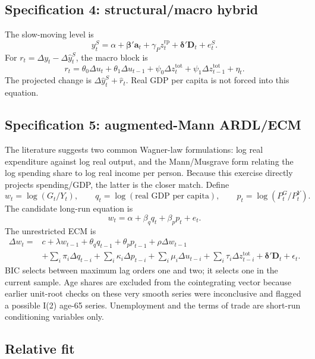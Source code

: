 \documentclass[11pt,a4paper]{article}
\begin{document}
\subsection{Specification 4: structural/macro hybrid}

The slow-moving level is
\begin{equation}
y_t^S=\alpha+\boldsymbol\beta'\mathbf a_t+\gamma_Pz_t^{\mathrm{rp}}
+\boldsymbol\delta'\mathbf D_t+e_t^S.
\end{equation}
For $r_t=\Delta y_t-\Delta\widehat y_t^S$, the macro block is
\begin{equation}
r_t=\theta_0\Delta u_t+\theta_1\Delta u_{t-1}
+\psi_0\Delta z_t^{\mathrm{tot}}+\psi_1\Delta z_{t-1}^{\mathrm{tot}}+\eta_t.
\end{equation}
The projected change is $\Delta\widehat y_t^S+\widehat r_t$. Real GDP per capita is not forced into this equation.

\subsection{Specification 5: augmented-Mann ARDL/ECM}

The literature suggests two common Wagner-law formulations: log real expenditure against log real output, and the Mann/Musgrave form relating the log spending share to log real income per person. Because this exercise directly projects spending/GDP, the latter is the closer match. Define
\[
w_t=\log(G_t/Y_t),\qquad q_t=\log(\text{real GDP per capita}),\qquad
p_t=\log(P_t^G/P_t^Y).
\]
The candidate long-run equation is
\begin{equation}
w_t=\alpha+\beta_q q_t+\beta_p p_t+e_t.
\end{equation}
The unrestricted ECM is
\begin{align}
\Delta w_t={}&c+\lambda w_{t-1}+\theta_q q_{t-1}+\theta_p p_{t-1}
+\rho\Delta w_{t-1}\\
&+\sum_i\pi_i\Delta q_{t-i}+\sum_i\kappa_i\Delta p_{t-i}
+\sum_i\mu_i\Delta u_{t-i}+\sum_i\tau_i\Delta z_{t-i}^{\mathrm{tot}}
+\boldsymbol\delta'\mathbf D_t+\epsilon_t.
\end{align}
BIC selects between maximum lag orders one and two; it selects one in the current sample. Age shares are excluded from the cointegrating vector because earlier unit-root checks on these very smooth series were inconclusive and flagged a possible I(2) age-65 series. Unemployment and the terms of trade are short-run conditioning variables only.

\subsection{Relative fit}
\end{document}
